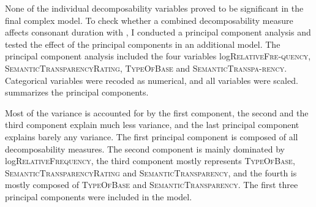 None of the individual decomposability variables proved to be significant in the final complex model. To check whether a combined decomposability measure affects consonant duration with , I conducted a principal component analysis and tested the effect of the principal components in an additional model. The principal component analysis included the four variables log\textsc{RelativeFre-quency}, \textsc{SemanticTransparencyRating}, \textsc{TypeOfBase} and \textsc{SemanticTranspa-rency}. Categorical variables were recoded as numerical, and all variables were scaled.  summarizes the principal components.



\begin{table}[b!]
	\caption{ Summary of principal components}
	\label{tbl: summary PC dis exp}
	
	
\end{table}


Most of the variance is accounted for by the first component, the second and the third component explain much less variance, and the last principal component explains barely any variance. 
The first principal component is composed of all decomposability measures. The second component is mainly dominated by log\textsc{RelativeFrequency}, the third component mostly represents \textsc{TypeOfBase}, \textsc{SemanticTransparencyRating} and \textsc{SemanticTransparency}, and the fourth is mostly composed of \textsc{TypeOfBase} and \textsc{SemanticTransparency}. The first three principal components were included in the model.


